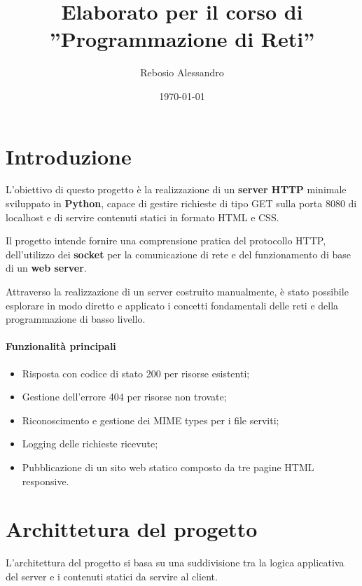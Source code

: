 \documentclass[a4paper,12pt]{report}
\title{Elaborato per il corso di\\''Programmazione di Reti''}
\author{Rebosio Alessandro}
\date{\today}
\begin{document}
\maketitle

\tableofcontents

\chapter{Introduzione}

L'obiettivo di questo progetto è la realizzazione di un \textbf{server HTTP} \newline minimale sviluppato in \textbf{Python},
capace di gestire richieste di tipo GET sulla porta 8080 di localhost e di servire contenuti statici
in formato HTML e CSS.

\vspace{0.5cm}

Il progetto intende fornire una comprensione pratica del protocollo HTTP, dell'utilizzo dei \textbf{socket}
per la comunicazione di rete e del funzionamento di base di un \textbf{web server}.

\vspace{0.5cm}

Attraverso la realizzazione di un server costruito manualmente, è stato possibile esplorare in modo diretto e
applicato i concetti fondamentali delle reti e della programmazione di basso livello.

\subsubsection{Funzionalità principali}
\begin{itemize}
    \item Risposta con codice di stato 200 per risorse esistenti;
    \item Gestione dell'errore 404 per risorse non trovate;
    \item Riconoscimento e gestione dei MIME types per i file serviti;
    \item Logging delle richieste ricevute;
    \item Pubblicazione di un sito web statico composto da tre pagine HTML responsive.
\end{itemize}

\chapter{Archittetura del progetto}
L'architettura del progetto si basa su una suddivisione tra la logica applicativa del server e i
contenuti statici da servire al client.
\end{document}

